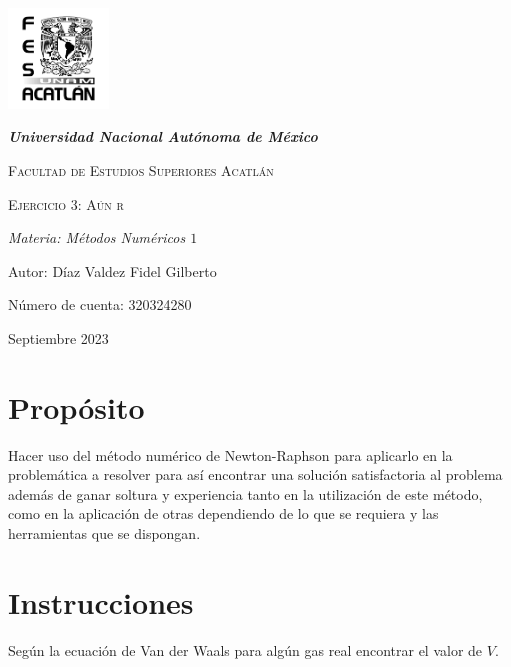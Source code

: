 \documentclass{article}
\begin{document}
    \begin{titlepage}
        \centering
        {\includegraphics[width=0.2\textwidth]{logo.png} \par}
        {\bfseries\LARGE\textit{Universidad Nacional Autónoma de México}\par}
        \vspace{1cm}

        {\scshape\Large Facultad de Estudios Superiores Acatlán \par}
        \vspace{3cm}

        {\scshape\Huge Ejercicio 3: Aún r}
        \vspace{3cm}

        {\slshape\Large Materia: Métodos Numéricos $1$ \par}
        \vfill

        {\Large Autor: Díaz Valdez Fidel Gilberto \par}
        {\Large Número de cuenta: 320324280 \par}

        \vfill
        {\Large Septiembre 2023 \par}

    \end{titlepage}

\section{Propósito}
Hacer uso del método numérico de Newton-Raphson para aplicarlo en la problemática a resolver para así encontrar una solución satisfactoria al problema además de ganar soltura y experiencia tanto en la utilización de este método, como en la aplicación de otras dependiendo de lo que se requiera y las herramientas que se dispongan. 

\section{Instrucciones}
Según la ecuación de Van der Waals para algún gas real encontrar el valor de $V$. 
\end{document}
